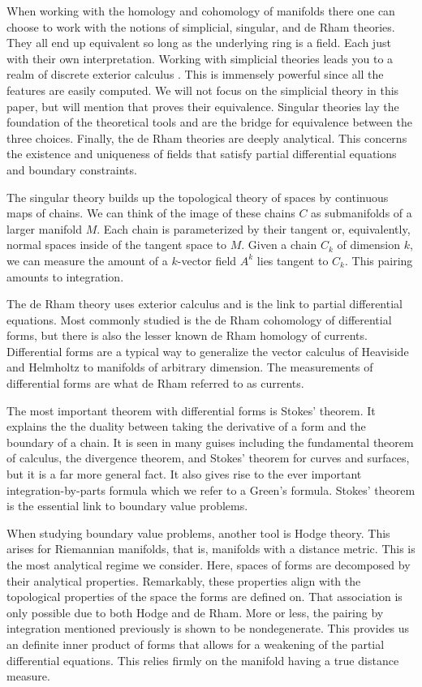 \documentclass{article}
\begin{document}
When working with the homology and cohomology of manifolds there one can choose to work with the notions of simplicial, singular, and de Rham theories. 
They all end up equivalent so long as the underlying ring is a field. 
Each just with their own interpretation. 
Working with simplicial theories leads you to a realm of discrete exterior calculus . 
This is immensely powerful since all the features are easily computed. 
We will not focus on the simplicial theory in this paper, but will mention that \cite{hatcher_algebraic_2002} proves their equivalence. 
Singular theories lay the foundation of the theoretical tools and are the bridge for equivalence between the three choices. 
Finally, the de Rham theories are deeply analytical. 
This concerns the existence and uniqueness of fields that satisfy partial differential equations and boundary constraints.

The singular theory builds up the topological theory of spaces by continuous maps of chains. 
We can think of the image of these chains $C$ as submanifolds of a larger manifold $M$. 
Each chain is parameterized by their tangent or, equivalently, normal spaces inside of the tangent space to $M$. 
Given a chain $C_k$ of dimension $k$, we can measure the amount of a $k$-vector field $A^k$ lies tangent to $C_k$. 
This pairing amounts to integration. 

The de Rham theory uses exterior calculus and is the link to partial differential equations. 
Most commonly studied is the de Rham cohomology of differential forms, but there is also the lesser known de Rham homology of currents. 
Differential forms are a typical way to generalize the vector calculus of Heaviside and Helmholtz  to manifolds of arbitrary dimension. 
The measurements of differential forms are what de Rham referred to as currents. 

The most important theorem with differential forms is Stokes' theorem. 
It explains the the duality between taking the derivative of a form and the boundary of a chain. 
It is seen in many guises including the fundamental theorem of calculus, the divergence theorem, and Stokes' theorem for curves and surfaces, but it is a far more general fact. 
It also gives rise to the ever important integration-by-parts formula which we refer to a Green's formula. 
Stokes' theorem is the essential link to boundary value problems.

When studying boundary value problems, another tool is Hodge theory. 
This arises for Riemannian manifolds, that is, manifolds with a distance metric. 
This is the most analytical regime we consider. 
Here, spaces of forms are decomposed by their analytical properties. 
Remarkably, these properties align with the topological properties of the space the forms are defined on. 
That association is only possible due to both Hodge and de Rham. 
More or less, the pairing by integration mentioned previously is shown to be nondegenerate. 
This provides us an definite inner product of forms that allows for a weakening of the partial differential equations. 
This relies firmly on the manifold having a true distance measure.
\end{document}

